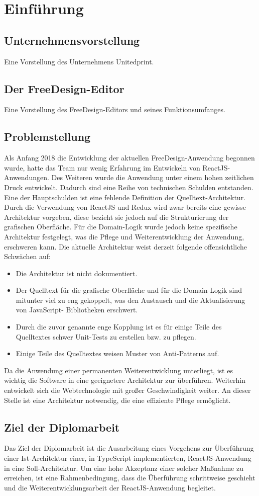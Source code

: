 \chapter{Einführung}
\section{Unternehmensvorstellung}
Eine Vorstellung des Unternehmens Unitedprint.
\section{Der FreeDesign-Editor}
Eine Vorstellung des FreeDesign-Editors und seines Funktionsumfanges.
\section{Problemstellung}
Als Anfang 2018 die Entwicklung der aktuellen FreeDesign-Anwendung begonnen wurde, hatte das Team nur wenig Erfahrung im Entwickeln von ReactJS-Anwendungen. Des Weiteren wurde die Anwendung unter einem hohen zeitlichen Druck entwickelt.
Dadurch sind eine Reihe von technischen Schulden entstanden. Eine der Hauptschulden ist eine fehlende Definition der Quelltext-Architektur. Durch die Verwendung von ReactJS und Redux wird zwar bereits eine gewisse Architektur vorgeben, diese bezieht sie jedoch auf die Strukturierung der grafischen Oberfläche. Für die Domain-Logik wurde jedoch keine spezifische Architektur festgelegt, was die Pflege und Weiterentwicklung der Anwendung, erschweren kann.
Die aktuelle Architektur weist derzeit folgende offensichtliche Schwächen auf:
\begin{itemize}
  \item Die Architektur ist nicht dokumentiert.
  \item Der Quelltext für die grafische Oberfläche und für die Domain-Logik sind mitunter viel
  zu eng gekoppelt, was den Austausch und die Aktualisierung von JavaScript-
  Bibliotheken erschwert.
  \item Durch die zuvor genannte enge Kopplung ist es für einige Teile des Quelltextes
  schwer Unit-Tests zu erstellen bzw. zu pflegen.
  \item Einige Teile des Quelltextes weisen Muster von Anti-Patterns auf.
\end{itemize}
Da die Anwendung einer permanenten Weiterentwicklung unterliegt, ist es wichtig die Software in eine geeignetere Architektur zur überführen. Weiterhin entwickelt sich die Webtechnologie mit großer Geschwindigkeit weiter. An dieser Stelle ist eine Architektur notwendig, die eine effiziente Pflege ermöglicht.

\section{Ziel der Diplomarbeit}
Das Ziel der Diplomarbeit ist die Ausarbeitung eines Vorgehens zur Überführung einer Ist-Architektur einer, in TypeScript implementierten, ReactJS-Anwendung in eine Soll-Architektur. Um eine hohe Akzeptanz einer solcher Maßnahme zu erreichen, ist eine Rahmenbedingung, dass die Überführung schrittweise geschieht und die Weiterentwicklungsarbeit der ReactJS-Anwendung begleitet.
